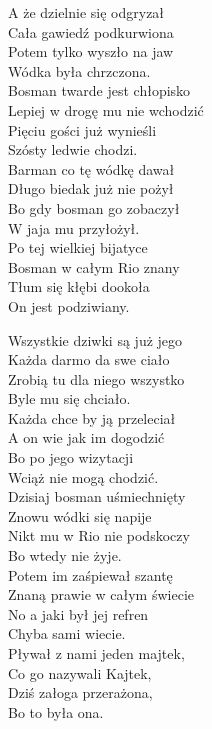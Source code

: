 \begin{multicols}{2}
A że dzielnie się odgryzał\\
Cała gawiedź podkurwiona\\
Potem tylko wyszło na jaw\\
Wódka była chrzczona.\\

Bosman twarde jest chłopisko\\
Lepiej w drogę mu nie wchodzić\\
Pięciu gości już wynieśli\\
Szósty ledwie chodzi.\\

Barman co tę wódkę dawał\\
Długo biedak już nie pożył\\
Bo gdy bosman go zobaczył\\
W jaja mu przyłożył.\\

Po tej wielkiej bijatyce\\
Bosman w całym Rio znany\\
Tłum się kłębi dookoła\\
On jest podziwiany.\\
\newcolumn

Wszystkie dziwki są już jego\\
Każda darmo da swe ciało\\
Zrobią tu dla niego wszystko\\
Byle mu się chciało.\\

Każda chce by ją przeleciał\\
A on wie jak im dogodzić\\
Bo po jego wizytacji\\
Wciąż nie mogą chodzić.\\

Dzisiaj bosman uśmiechnięty\\
Znowu wódki się napije\\
Nikt mu w Rio nie podskoczy\\
Bo wtedy nie żyje.\\

Potem im zaśpiewał szantę\\
Znaną prawie w całym świecie\\
No a jaki był jej refren\\
Chyba sami wiecie.\\

Pływał z nami jeden majtek, \\
Co go nazywali Kajtek, \\
Dziś załoga przerażona, \\
Bo to była ona.\\


\end{multicols}
